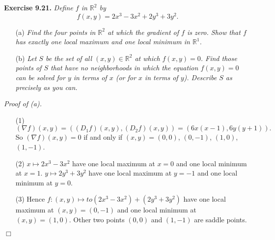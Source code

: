 \documentclass{article}
\begin{document}
\textbf{Exercise 9.21.}
\emph{Define $f$ in $\mathbb{R}^2$ by}
\[
  f(x,y) = 2x^3-3x^2+2y^3+3y^2.
\]
\begin{enumerate}
\item[(a)]
  \emph{Find the four points in $\mathbb{R}^2$ at which the gradient of $f$ is zero.
  Show that $f$ has exactly one local maximum and one local minimum in $\mathbb{R}^1$.}

\item[(b)]
  \emph{Let $S$ be the set of all $(x,y) \in \mathbb{R}^2$ at which $f(x,y) = 0$.
  Find those points of $S$ that have no neighborhoods in which the equation
  $f(x,y) = 0$ can be solved for $y$ in terms of $x$ (or for $x$ in terms of $y$).
  Describe $S$ as precisely as you can.} \\
\end{enumerate}



\emph{Proof of (a).}
\begin{enumerate}
\item[(1)]
  \[
    (\nabla f)(x,y)
    = ((D_1 f)(x,y), (D_2 f)(x,y))
    = (6x(x-1), 6y(y+1)).
  \]
  So $(\nabla f)(x,y) = 0$ if and only if
  $(x,y) = (0,0)$, $(0,-1)$, $(1,0)$, $(1,-1)$.

\item[(2)]
  $x \mapsto 2x^3 - 3x^2$
  have one local maximum at $x = 0$ and one local minimum at $x = 1$.
  $y \mapsto 2y^3 + 3y^2$
  have one local maximum at $y = -1$ and one local minimum at $y = 0$.

\item[(3)]
  Hence $f: (x,y) \mapsto to (2x^3 - 3x^2) + (2y^3 + 3y^2)$
  have one local maximum at $(x,y) = (0,-1)$ and
  one local minimum at $(x,y) = (1,0)$.
  Other two points $(0,0)$ and $(1,-1)$ are saddle points.
\end{enumerate}
$\Box$ \\
\end{document}
